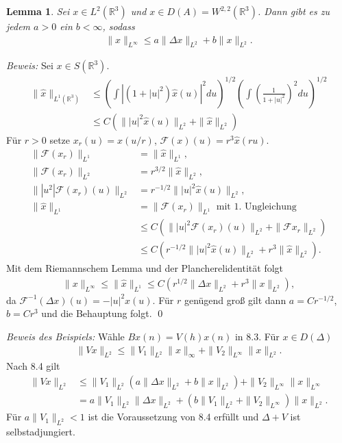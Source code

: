 \documentclass[12pt]{extreport} %
\newtheorem{Lemma}[Satz]{Lemma}
\numberwithin{equation}{section}
\newcommand{\R}{\mathbb{R}} %
\newcommand{\F}{\mathcal{F}}
\newcommand{\Bew}{\emph{Beweis: }}
\newcommand{\laplace}{\Delta}
\begin{document}
	\begin{Lemma}
		 Sei $x\in L^2(\R^3)$ und $x\in D(A)=W^{2,2}(\R^3)$. Dann gibt es zu jedem $a>0$ ein $b<\infty$, sodass
		 \begin{align*}
		 	\|x\|_{L^\infty}\leq a\|\laplace x\|_{L^2} + b\|x\|_{L^2}.
		 \end{align*}
	\end{Lemma}
	
	\Bew Sei $x\in S(\R^3)$.
	\begin{align*}
		\|\hat x \|_{L^1(\R^3)}&\leq \left(\int |(1+|u|^2)\hat x(u)|^2du \right)^{1/2}\left(\int \left(\frac{1}{1+|u|^2} \right)^2du \right)^{1/2}\\
		&\leq C(\| |u|^2\hat x(u)\|_{L^2}+\|\hat x\|_{L^2})
	\end{align*}
	Für $r> 0$ setze $x_r(u) = x(u/r)$, $\F(x)(u) = r^3 \hat x (ru)$.
	\begin{align*}
		\|\F(x_r)\|_{L^1} &= \|\hat x\|_{L^1},\\
		\|\F(x_r)\|_{L^2} &= r^{3/2}\|\hat x\|_{L^2},\\
		\||u^2| \F(x_r)(u)\|_{L^2}&= r^{-1/2}\||u|^2\hat x(u)\|_{L^2},\\
		\|\hat x\|_{L^1} &= \|\F(x_r)\|_{L^1} \text{ mit 1. Ungleichung}\\
		&\leq C(\| |u|^2 \F(x_r)(u) \|_{L^2} + \|\F x_r\|_{L^2})\\
		&\leq C(r^{-1/2}\| |u|^2 \hat x (u)\|_{L^2} + r^3 \|\hat x\|_{L^2}).	
	\end{align*}
	Mit dem Riemannschem Lemma und der Plancherelidentität folgt
	\begin{align*}
		\|x\|_{L^\infty} \leq \|\hat x\|_{L^1}\leq C(r^{1/2}\|\laplace x\|_{L^2} + r^3\|x\|_{L^2}),
	\end{align*}
	da $\F^{-1}(\laplace x)(u) = -|u|^2x(u)$. Für $r$ genügend groß gilt dann $a = C r^{-1/2}$, $b = Cr^3$ und die Behauptung folgt.
	\qed
	
	\emph{Beweis des Beispiels:} Wähle $Bx(n) = V(h)x(n)$ in 8.3. Für $x\in D(\laplace)$
	\begin{align*}
		\|V x\|_{L^2}\leq \|V_1\|_{L^2}\|x\|_{\infty} + \|V_2\|_{L^\infty}\|x\|_{L^2}.
	\end{align*}
	Nach 8.4 gilt
	\begin{align*}
		\|Vx\|_{L^2} &\leq \|V_1\|_{L^2}(a\|\laplace x\|_{L^2} + b\|x\|_{L^2}) + \|V_2\|_{L^\infty} \|x\|_{L^\infty}\\
		&= a\|V_1\|_{L^2} \|\laplace x\|_{L^2} + (b\|V_1\|_{L^2} + \|V_2\|_{L^\infty}) \|x\|_{L^2}.
	\end{align*}
	Für $a\|V_1\|_{L^2}<1$ ist die Voraussetzung von 8.4 erfüllt und $\laplace+V$ ist selbstadjungiert.
	
\end{document}
